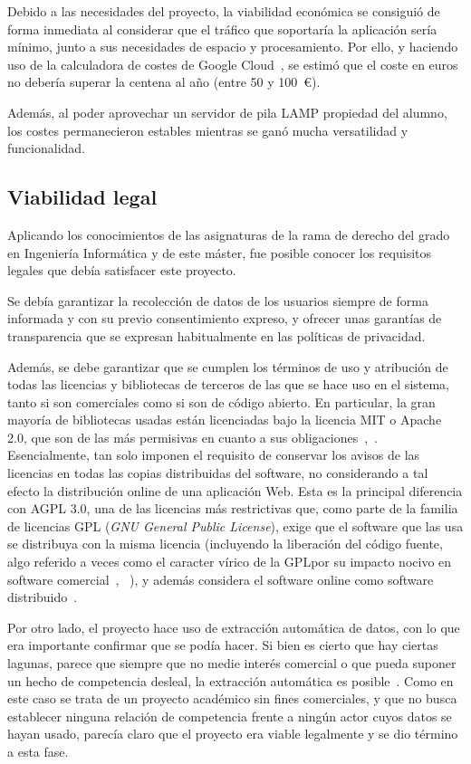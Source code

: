 Debido a las necesidades del proyecto, la viabilidad económica se consiguió de forma inmediata al considerar que el tráfico que soportaría la aplicación sería mínimo, junto a sus necesidades de espacio y procesamiento. Por ello, y haciendo uso de la calculadora de costes de Google Cloud~\cite{calculadora_app_engine}, se estimó que el coste en euros no debería superar la centena al año (entre 50 y 100~€).

Además, al poder aprovechar un servidor de pila LAMP propiedad del alumno, los costes permanecieron estables mientras se ganó mucha versatilidad y funcionalidad.

\subsection{Viabilidad legal}

Aplicando los conocimientos de las asignaturas de la rama de derecho del grado en Ingeniería Informática y de este máster, fue posible conocer los requisitos legales que debía satisfacer este proyecto.

Se debía garantizar la recolección de datos de los usuarios siempre de forma informada y con su previo consentimiento expreso, y ofrecer unas garantías de transparencia que se expresan habitualmente en las políticas de privacidad.

Además, se debe garantizar que se cumplen los términos de uso y atribución de todas las licencias y bibliotecas de terceros de las que se hace uso en el sistema, tanto si son comerciales como si son de código abierto. En particular, la gran mayoría de bibliotecas usadas están licenciadas bajo la licencia MIT o Apache 2.0, que son de las más permisivas en cuanto a sus obligaciones~\cite{MIT},~\cite{Apache2}. Esencialmente, tan solo imponen el requisito de conservar los avisos de las licencias en todas las copias distribuidas del software, no considerando a tal efecto la distribución online de una aplicación Web. Esta es la principal diferencia con AGPL 3.0, una de las licencias más restrictivas que, como parte de la familia de licencias GPL (\textit{GNU General Public License}), exige que el software que las usa se distribuya con la misma licencia (incluyendo la liberación del código fuente, algo referido a veces como \guillemotleft el caracter vírico de la GPL\guillemotright\space por su impacto nocivo en software comercial~\cite{licencia_virica}, ~\cite{GPL}), y además considera el software online como software distribuido~\cite{AGPL}.

Por otro lado, el proyecto hace uso de extracción automática de datos, con lo que era importante confirmar que se podía hacer. Si bien es cierto que hay ciertas lagunas, parece que siempre que no medie interés comercial o que pueda suponer un hecho de competencia desleal, la extracción automática es posible~\cite{scraping_legal}. Como en este caso se trata de un proyecto académico sin fines comerciales, y que no busca establecer ninguna relación de competencia frente a ningún actor cuyos datos se hayan usado, parecía claro que el proyecto era viable legalmente y se dio término a esta fase.